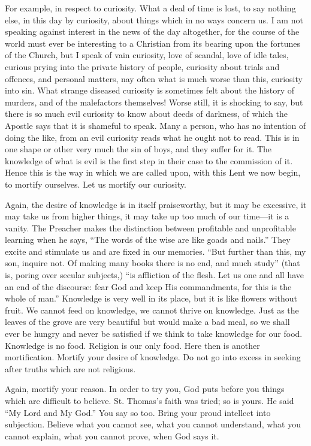 For example, in respect to curiosity. What a deal
of time is lost, to say nothing else, in this day by curiosity, about
things which in no ways concern us. I am not speaking against interest
in the news of the day altogether, for the course of the world must
ever be interesting to a Christian from its bearing upon the fortunes
of the Church, but I speak of vain curiosity, love of scandal, love of
idle tales, curious prying into the private history of people,
curiosity about trials and offences, and personal matters, nay often
what is much worse than this, curiosity into sin. What strange
diseased curiosity is sometimes felt about the history of murders, and
of the malefactors themselves! Worse still, it is shocking to say, but
there is so much evil curiosity to know about deeds of darkness, of
which the Apostle says that it is shameful to speak. Many a person,
who has no intention of doing the like, from an evil curiosity reads
what he ought not to read. This is in one shape or other very much the
sin of boys, and they suffer for it. The knowledge of what is evil is
the first step in their case to the commission of it. Hence this is
the way in which we are called upon, with this Lent we now begin, to
mortify ourselves. Let us mortify our curiosity.

Again, the desire of knowledge is in itself
praiseworthy, but it may be excessive, it may take us from higher things, it may take up too much of our time—it is a vanity. The
Preacher makes the distinction between profitable and unprofitable
learning when he says, ``The words of the wise are like goads and
nails.'' They excite and stimulate us and are fixed in our memories.
``But further than this, my son, inquire not. Of making many books
there is no end, and much study'' (that is, poring over secular
subjects,) ``is affliction of the flesh. Let us one and all have
an end of the discourse: fear God and keep His commandments, for this
is the whole of man.'' Knowledge is very well in its place, but it is
like flowers without fruit. We cannot feed on knowledge, we cannot
thrive on knowledge. Just as the leaves of the grove are very
beautiful but would make a bad meal, so we shall ever be hungry and
never be satisfied if we think to take knowledge for our food.
Knowledge is no food. Religion is our only food. Here then is another
mortification. Mortify your desire of knowledge. Do not go into excess
in seeking after truths which are not religious.

Again, mortify your reason. In order to try you,
God puts before you things which are difficult to believe. St. Thomas's
faith was tried; so is yours. He said ``My Lord and My God.'' You
say so too. Bring your proud intellect into subjection. Believe what
you cannot see, what you cannot understand, what you cannot explain,
what you cannot prove, when God says it.

